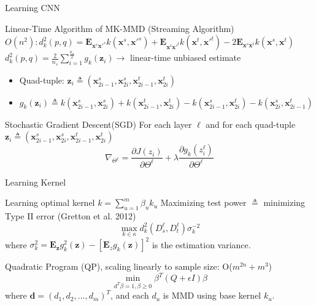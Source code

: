 \documentclass{beamer}
\begin{document}
\begin{frame}[fragile]{Learning CNN}
\begin{block}{Linear-Time Algorithm of MK-MMD (Streaming Algorithm)}
$O(n^2):d_k^2(p,q)=\mathbf{E}_{\mathbf{x}^s\mathbf{x}\prime^s}k(\mathbf{x}^s,\mathbf{x}\prime^s)+\mathbf{E}_{\mathbf{x}^t\mathbf{x}\prime^t}k(\mathbf{x}^t,\mathbf{x}\prime^t)-2\mathbf{E}_{\mathbf{x}^s\mathbf{x}^t}k(\mathbf{x}^s,\mathbf{x}^t)$
$d_k^2(p,q)=\frac{2}{n_s}\sum\nolimits_{i=1}^{\frac{n_s}{2}}g_k(\mathbf{z}_i) \to$ linear-time unbiased estimate
\begin{itemize}
\item{Quad-tuple: $\textbf{z}_i\triangleq (\textbf{x}_{2i-1}^s, \textbf{x}_{2i}^s, \textbf{x}_{2i-1}^t, \textbf{x}_{2i}^t)$}
\item{$g_k(\textbf{z}_i) \triangleq k(\textbf{x}_{2i-1}^s, \textbf{x}_{2i}^s) + k(\textbf{x}_{2i-1}^t, \textbf{x}_{2i}^t) - k(\textbf{x}_{2i-1}^s, \textbf{x}_{2i}^t) - k(\textbf{x}_{2i}^s, \textbf{x}_{2i-1}^t)$}
\end{itemize}
\end{block}
\begin{block}{Stochastic Gradient Descent(SGD)}
For each layer $\ell$ and for each quad-tuple $\textbf{z}_i\triangleq (\textbf{x}_{2i-1}^s, \textbf{x}_{2i}^s, \textbf{x}_{2i-1}^t, \textbf{x}_{2i}^t)$
\begin{equation}
\nabla_{\Theta^\ell}=\frac{\partial{J(z_i)}}{\partial\Theta^\ell}+\lambda\frac{\partial g_k(z_i^\ell)}{\partial \Theta^\ell}
\end{equation}
\end{block}
\end{frame}

\begin{frame}[fragile]{Learning Kernel}
\begin{block}{Learning optimal kernel $k = \sum_{u=1}^m\beta_uk_u$}
Maximizing test power $\triangleq$ minimizing Type II error (Gretton et al. 2012)
\begin{equation}
\max\limits_{k \in \kappa}d_k^2(D_s^\ell,D_t^\ell)\sigma_k^{-2}
\end{equation}
where $\sigma_k^2 = \mathbf{E}_{\mathbf{z}}g_k^2(\mathbf{z})-[\mathbf{E}_{z}g_k(\mathbf{z})]^2$ is the estimation variance.
\end{block}
\begin{block}{Quadratic Program (QP), scaling linearly to sample size: O($m^{2n} + m^3$)}
\begin{equation}
\min\limits_{d^T\beta=1,\beta\geq0}\beta^T(Q+\epsilon I)\beta
\end{equation}
where $\mathbf{d} = (d_1, d_2, ..., d_m)^T$, and each $d_u$ is MMD using base kernel $k_u$.
\end{block}
\end{frame}
\end{document}
